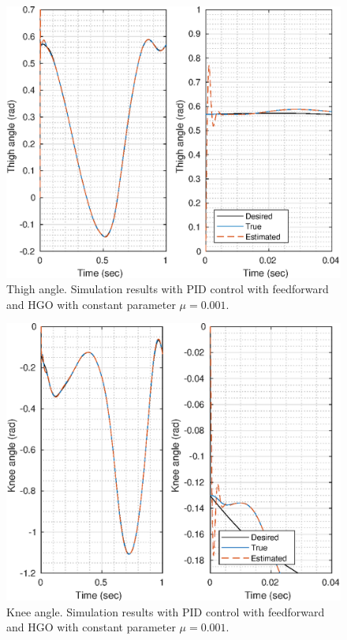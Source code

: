 \documentclass[letterpaper, 10 pt, conference]{ieeeconf}  %
\theoremstyle{plain}
\theoremstyle{definition}
\theoremstyle{remark}
\begin{document}
\begin{figure}[h!]
\begin{center}
\includegraphics[width = 13cm]{Figs/q_thigh_mu_1e-03.eps}
\caption{Thigh angle. Simulation results with PID control with feedforward and HGO with constant parameter $\mu=0.001$.}
\label{fig:thigh}
\end{center}
\end{figure}
%
%
\begin{figure}[h!]
\begin{center}
\includegraphics[width = 13cm]{Figs/q_knee_mu_1e-03.eps}
\caption{Knee angle. Simulation results with PID control with feedforward and HGO with constant parameter $\mu=0.001$.}
\label{fig:knee}
\end{center}
\end{figure}
\end{document}
